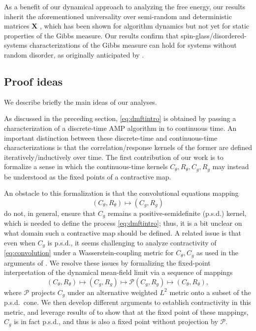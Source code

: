 \documentclass[11pt,letterpaper,reqno]{amsart}
\def\X{\mathbf{X}}
\def\cP{\mathcal{P}}
\theoremstyle{definition}
\numberwithin{equation}{section}
\begin{document}
As a benefit of our dynamical approach to analyzing the free energy, our results inherit the aforementioned universality over semi-random and deterministic matrices $\X$ \cite{dudeja2023universality,wang2024universality,gorini2026universality}, which has been shown for algorithm dynamics but not yet for static properties of the Gibbs measure. Our results confirm that spin-glass/disordered-systems characterizations of the Gibbs measure can hold for systems without random disorder, as originally anticipated by \cite{marinari1994replica}.


\subsection{Proof ideas}\label{sec:proof}
We describe briefly the main ideas of our analyses.

As discussed in the preceding section, \eqref{eq:dmftintro} is obtained by
passing a characterization of a discrete-time AMP algorithm in
\cite{opper2016theory,fan2022approximate} to
continuous time. An important distinction between these discrete-time
and continuous-time characterizations is that the correlation/response kernels
of the former are defined iteratively/inductively over time. The first contribution of our work is to formalize a sense in which the continuous-time kernels
$C_\theta,R_\theta,C_g,R_g$ may instead be understood as the fixed points of a
contractive map.

An obstacle to this formalization is that the convolutional
equations mapping
\begin{equation}\label{eq:convolution}
(C_\theta,R_\theta) \mapsto (C_g,R_g)
\end{equation}
do not, in general, ensure that $C_g$ remains a positive-semidefinite (p.s.d.)
kernel, which is needed to define the process \eqref{eq:dmftintro}; thus, it
is a bit unclear on what domain such a contractive map should be defined.
A related issue is that even when $C_g$ is p.s.d., it seems challenging to
analyze contractivity of \eqref{eq:convolution} under a Wasserstein-coupling
metric for $C_\theta,C_g$ as used in the arguments of
\cite{celentano2021high,fan2025dynamicalI,fan2026high}. We resolve these issues by
formalizing the fixed-point interpretation of the dynamical mean-field limit
via a sequence of mappings
\[(C_\theta,R_\theta) \mapsto (C_g,R_g) \mapsto \cP(C_g,R_g) \mapsto (C_\theta,R_\theta),\]
where $\cP$ projects $C_g$ under an alternative weighted $L^2$ metric onto a subset of the p.s.d.\ cone. We then
develop different arguments to
establish contractivity in this metric, and leverage results of \cite{fan2022approximate} to show that at the fixed point of these mappings, $C_g$ is in fact p.s.d., and thus is also a fixed point without projection by $\cP$.
\end{document}
